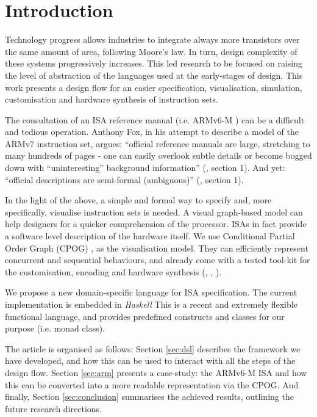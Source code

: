\documentclass[conference]{IEEEtran}
\begin{document}
\IEEEpeerreviewmaketitle


\section{Introduction}
\label{sec:intro}
Technology progress allows industries to integrate always more transistors over the
same amount of area, following Moore's law. In turn, design complexity of these
systems progressively increases. This led research to be focused on raising the
level of abstraction of the languages used at the early-stages of design. This work
presents a design flow for an easier specification, visualisation, simulation,
customisation and hardware synthesis of instruction sets.

The consultation of an ISA reference manual (i.e. ARMv6-M \cite{armManual}) can be
a difficult and tedious operation. Anthony Fox, in his attempt to describe a model
of the ARMv7 instruction set, argues: ``official reference manuals are large,
stretching to many hundreds of pages - one can easily overlook subtle details or
become bogged down with ``uninteresting'' background information'' (\cite{armv7},
section 1). And yet: ``official descriptions are semi-formal (ambiguous)''
(\cite{armv7}, section 1). 

In the light of the above, a simple and formal way to specify and, more
specifically, visualise instruction sets is needed. A visual graph-based model can
help designers for a quicker comprehension of the processor. ISAs in fact provide a
software level description of the hardware itself. We use Conditional Partial Order
Graph (CPOG) \cite{cpog},\cite{andreyPhd} as the visualisation model. They can
efficiently represent concurrent and sequential behaviours, and already come with a
tested tool-kit for the customisation, encoding and hardware synthesis
(\cite{workcraft}, \cite{satEncoding}, \cite{acsd}).

We propose a new domain-specific language for ISA specification. The current
implementation is embedded in \textit{Haskell} This is a recent and extremely
flexible functional language, and provides predefined constructs and classes for
our purpose (i.e. monad class).

The article is organised as follows: Section \ref{sec:dsl} describes the framework
we have developed, and how this can be used to interact with all the steps of the 
design flow. Section \ref{sec:arm} presents a case-study: the ARMv6-M ISA and how this
can be converted into a more readable representation via the CPOG. 
And finally, Section \ref{sec:conclusion} summarises the achieved results, 
outlining the future research directions.
\end{document}
